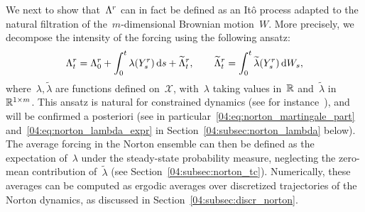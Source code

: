 We next to show that~$\Lambda^r$ can in fact be defined as an Itô process adapted to the natural filtration of the~$m$-dimensional Brownian motion~$W$. More precisely, we decompose the intensity of the forcing using the following ansatz:
\begin{equation}
    \label{04:eq:norton_lambda_sde}
    \Lambda^r_t = \Lambda^r_0 + \int_0^t \lambda(Y^r_s)\, \mathrm{d} s + \widetilde{\Lambda}_t^r,\qquad  \widetilde{\Lambda}_t^r = \int_0^t \widetilde{\lambda}(Y^r_s)\,\mathrm{d} W_s,
\end{equation}
where~$\lambda,\widetilde{\lambda}$ are functions defined on~$\mathcal X$, with~$\lambda$ taking values in~$\mathbb{R}$ and~$\widetilde \lambda$ in~$\mathbb{R}^{1\times m}$. This ansatz is natural for constrained dynamics (see for instance~\cite[Chapter 3]{LRS10}), and will be confirmed a posteriori (see in particular~\eqref{04:eq:norton_martingale_part} and~\eqref{04:eq:norton_lambda_expr} in Section~\ref{04:subsec:norton_lambda} below). The average forcing in the Norton ensemble can then be defined as the expectation of~$\lambda$ under the steady-state probability measure, neglecting the zero-mean contribution of~$\widetilde{\lambda}$ (see Section~\ref{04:subsec:norton_tc}).
Numerically, these averages can be computed as ergodic averages over discretized trajectories of the Norton dynamics, as discussed in Section~\ref{04:subsec:discr_norton}.

